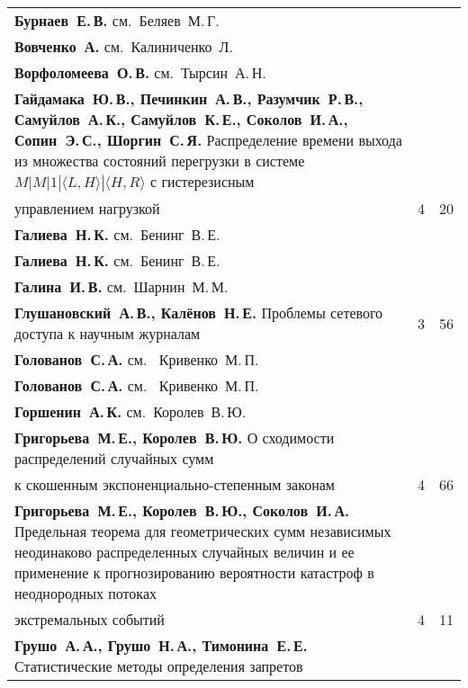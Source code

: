 {\begin{tabular}{p{388pt}rr}
\textbf{Бурнаев~Е.\,В.} см.~Беляев~М.\,Г.&&\\
\textbf{Вовченко~А.} см.~Калиниченко~Л.&&\\
\textbf{Ворфоломеева~О.\,В.} см.~Тырсин~А.\,Н.&&\\
\hangindent=23pt\noindent\textbf{Гайдамака~Ю.\,В., Печинкин~А.\,В., Разумчик~Р.\,В., Самуйлов~А.\,К.,
Самуйлов~К.\,Е., Соколов~И.\,А., Сопин~Э.\,С., Шоргин~С.\,Я.}
Распределение времени выхода из множества состояний перегрузки в системе
$M|M|1|\langle L,H \rangle |\langle H,R \rangle$ с гистерезисным\linebreak
\vspace*{-12pt}\\
\hspace*{23pt}управлением нагрузкой\dotfill&4&20\\
\textbf{Галиева~Н.\,К.} см.~Бенинг~В.\,Е.&&\\
\textbf{Галиева~Н.\,К.} см.~Бенинг~В.\,Е.&&\\
\textbf{Галина~И.\,В.} см.~Шарнин~М.\,М.&&\\
\textbf{Глушановский~А.\,В., Калёнов~Н.\,Е.}
Проблемы сетевого доступа к научным журналам\dotfill&3&56\\
\textbf{Голованов~С.\,А.} см.~ Кривенко~М.\,П.&&\\
\textbf{Голованов~С.\,А.} см.~ Кривенко~М.\,П.&&\\
\textbf{Горшенин~А.\,К.} см.~Королев~В.\,Ю.&&\\
\textbf{Григорьева~М.\,Е., Королев~В.\,Ю.}
О сходимости распределений случайных сумм\linebreak
\vspace*{-12pt}\\
\hspace*{23pt}к скошенным экспоненциально-степенным законам\dotfill&4&66\\
\hangindent=23pt\noindent\textbf{Григорьева~М.\,Е., Королев~В.\,Ю., Соколов~И.\,А.}
Предельная теорема для геометрических сумм независимых неодинаково
распределенных случайных величин и ее применение к прогнозированию
вероятности катастроф в неоднородных потоках\linebreak
\vspace*{-12pt}\\
\hspace*{23pt}экстремальных событий\dotfill&4&11\\
\textbf{Грушо~А.\,А., Грушо~Н.\,А., Тимонина~Е.\,Е.}
Статистические методы определения запретов\linebreak
\vspace*{-12pt}\\

\end{tabular}}
